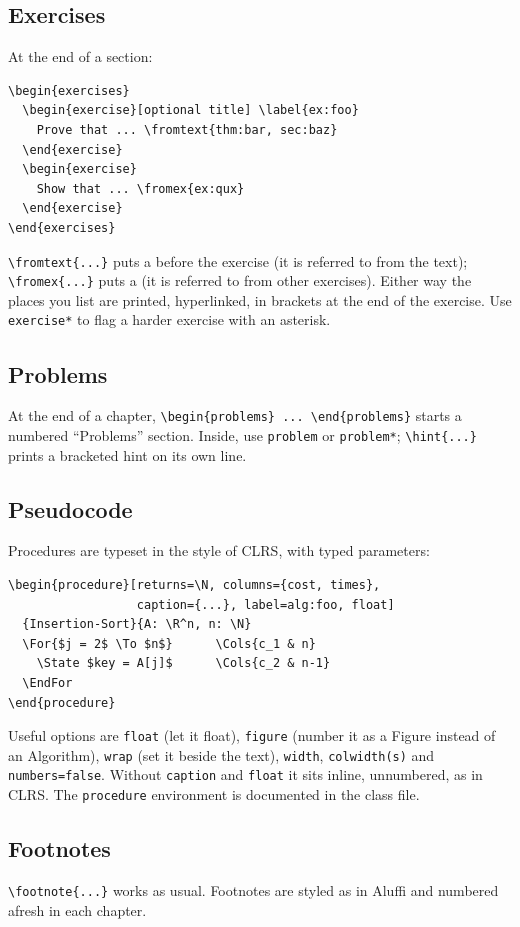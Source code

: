 \subsection*{Exercises}
At the end of a section:
\begin{verbatim}
\begin{exercises}
  \begin{exercise}[optional title] \label{ex:foo}
    Prove that ... \fromtext{thm:bar, sec:baz}
  \end{exercise}
  \begin{exercise}
    Show that ... \fromex{ex:qux}
  \end{exercise}
\end{exercises}
\end{verbatim}
\verb|\fromtext{...}| puts a \MBtextmarker{} before the exercise (it is
referred to from the text); \verb|\fromex{...}| puts a \MBexmarker{} (it is
referred to from other exercises). Either way the places you list are printed,
hyperlinked, in brackets at the end of the exercise. Use
\verb|exercise*| to flag a harder exercise with an asterisk.

\subsection*{Problems}
At the end of a chapter, \verb|\begin{problems} ... \end{problems}| starts a
numbered ``Problems'' section. Inside, use \verb|problem| or \verb|problem*|;
\verb|\hint{...}| prints a bracketed hint on its own line.

\subsection*{Pseudocode}
Procedures are typeset in the style of CLRS, with typed parameters:
\begin{verbatim}
\begin{procedure}[returns=\N, columns={cost, times},
                  caption={...}, label=alg:foo, float]
  {Insertion-Sort}{A: \R^n, n: \N}
  \For{$j = 2$ \To $n$}      \Cols{c_1 & n}
    \State $key = A[j]$      \Cols{c_2 & n-1}
  \EndFor
\end{procedure}
\end{verbatim}
Useful options are \verb|float| (let it float), \verb|figure| (number it as
a Figure instead of an Algorithm), \verb|wrap| (set it beside the text),
\verb|width|, \verb|colwidth(s)| and \verb|numbers=false|. Without
\verb|caption| and \verb|float| it sits inline, unnumbered, as in CLRS.
The \texttt{procedure} environment is documented in the class file.

\subsection*{Footnotes}
\verb|\footnote{...}| works as usual. Footnotes are styled as in Aluffi and
numbered afresh in each chapter.
